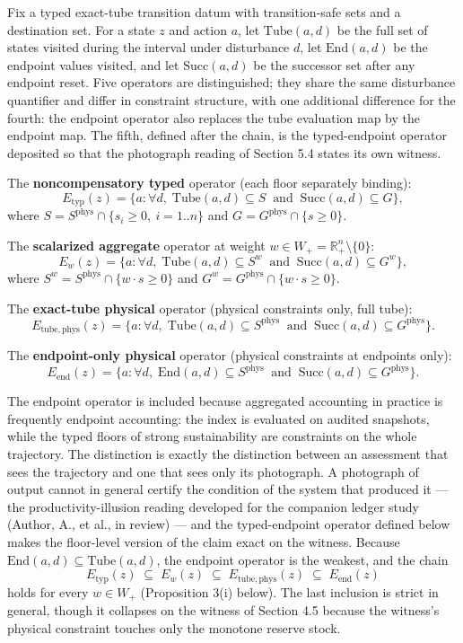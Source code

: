 \documentclass[11pt]{article}
\begin{document}
Fix a typed exact-tube transition datum with transition-safe sets and a
destination set. For a state \(z\) and action \(a\), let
\(\mathrm{Tube}(a,d)\) be the full set of states visited during the
interval under disturbance \(d\), let \(\mathrm{End}(a,d)\) be the
endpoint values visited, and let \(\mathrm{Succ}(a,d)\) be the successor
set after any endpoint reset. Five operators are distinguished; they
share the same disturbance quantifier and differ in constraint
structure, with one additional difference for the fourth: the endpoint
operator also replaces the tube evaluation map by the endpoint map. The
fifth, defined after the chain, is the typed-endpoint operator deposited
so that the photograph reading of Section 5.4 states its own witness.

The \textbf{noncompensatory typed} operator (each floor separately
binding):
\[E_{\mathrm{typ}}(z) = \{ a : \forall d,\; \mathrm{Tube}(a,d) \subseteq S \ \text{ and } \ \mathrm{Succ}(a,d) \subseteq G \},\]
where \(S = S^{\mathrm{phys}} \cap \{ s_i \ge 0,\ i = 1..n \}\) and
\(G = G^{\mathrm{phys}} \cap \{ s \ge 0 \}\).

The \textbf{scalarized aggregate} operator at weight
\(w \in W_+ = \mathbb{R}^n_+ \setminus \{0\}\):
\[E_w(z) = \{ a : \forall d,\; \mathrm{Tube}(a,d) \subseteq S^w \ \text{ and } \ \mathrm{Succ}(a,d) \subseteq G^w \},\]
where \(S^w = S^{\mathrm{phys}} \cap \{ w \cdot s \ge 0 \}\) and
\(G^w = G^{\mathrm{phys}} \cap \{ w \cdot s \ge 0 \}\).

The \textbf{exact-tube physical} operator (physical constraints only,
full tube):
\[E_{\mathrm{tube,phys}}(z) = \{ a : \forall d,\; \mathrm{Tube}(a,d) \subseteq S^{\mathrm{phys}} \ \text{ and } \ \mathrm{Succ}(a,d) \subseteq G^{\mathrm{phys}} \}.\]

The \textbf{endpoint-only physical} operator (physical constraints at
endpoints only):
\[E_{\mathrm{end}}(z) = \{ a : \forall d,\; \mathrm{End}(a,d) \subseteq S^{\mathrm{phys}} \ \text{ and } \ \mathrm{Succ}(a,d) \subseteq G^{\mathrm{phys}} \}.\]

The endpoint operator is included because aggregated accounting in
practice is frequently endpoint accounting: the index is evaluated on
audited snapshots, while the typed floors of strong sustainability are
constraints on the whole trajectory. The distinction is exactly the
distinction between an assessment that sees the trajectory and one that
sees only its photograph. A photograph of output cannot in general
certify the condition of the system that produced it --- the
productivity-illusion reading developed for the companion ledger study
(Author, A., et al., in review) --- and the typed-endpoint operator
defined below makes the floor-level version of the claim exact on the
witness. Because \(\mathrm{End}(a,d) \subseteq \mathrm{Tube}(a,d)\), the
endpoint operator is the weakest, and the chain
\[E_{\mathrm{typ}}(z) \;\subseteq\; E_w(z) \;\subseteq\; E_{\mathrm{tube,phys}}(z) \;\subseteq\; E_{\mathrm{end}}(z)\]
holds for every \(w \in W_+\) (Proposition 3(i) below). The last
inclusion is strict in general, though it collapses on the witness of
Section 4.5 because the witness's physical constraint touches only the
monotone reserve stock.
\end{document}
